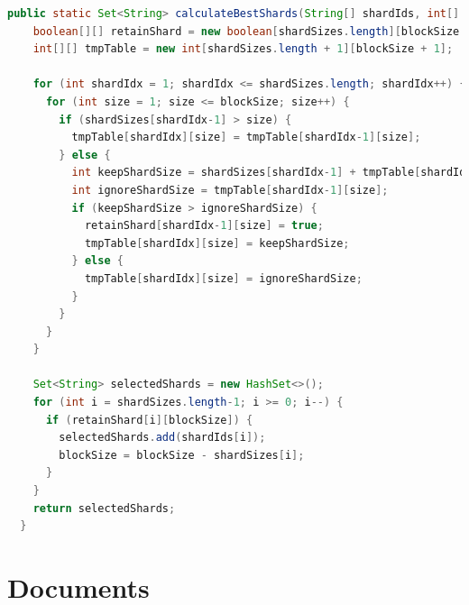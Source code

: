 \documentclass[11pt, a4paper, twocolumn, twoside]{report}
\begin{document}
\begin{lstlisting}[language=Java, caption=Knapsack Shard to Block Fitter, label=lst:shard2block]
  public static Set<String> calculateBestShards(String[] shardIds, int[] shardSizes, int blockSize) {
    boolean[][] retainShard = new boolean[shardSizes.length][blockSize + 1];
    int[][] tmpTable = new int[shardSizes.length + 1][blockSize + 1];

    for (int shardIdx = 1; shardIdx <= shardSizes.length; shardIdx++) {
      for (int size = 1; size <= blockSize; size++) {
        if (shardSizes[shardIdx-1] > size) {
          tmpTable[shardIdx][size] = tmpTable[shardIdx-1][size];
        } else {
          int keepShardSize = shardSizes[shardIdx-1] + tmpTable[shardIdx-1][size-shardSizes[shardIdx-1]];
          int ignoreShardSize = tmpTable[shardIdx-1][size];
          if (keepShardSize > ignoreShardSize) {
            retainShard[shardIdx-1][size] = true;
            tmpTable[shardIdx][size] = keepShardSize;
          } else {
            tmpTable[shardIdx][size] = ignoreShardSize;
          }
        }
      }
    }

    Set<String> selectedShards = new HashSet<>();
    for (int i = shardSizes.length-1; i >= 0; i--) {
      if (retainShard[i][blockSize]) {
        selectedShards.add(shardIds[i]);
        blockSize = blockSize - shardSizes[i];
      }
    }
    return selectedShards;
  }
\end{lstlisting}

\section{Documents}
\end{document}

